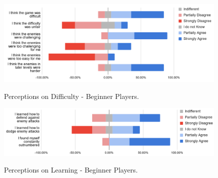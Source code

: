 

\begin{figure}[!ht]
    \begin{center}
    \caption{Perceptions on Difficulty - Beginner Players.}
        \includegraphics[width=36em]{figures/fig-perception-difficulty-beginner-players.png}
        \label{fig:perception-difficulty-beginner-players}
    \end{center}
\end{figure}

\begin{figure}[!ht]
    \begin{center}
    \caption{Perceptions on Learning - Beginner Players.}
        \includegraphics[width=36em]{figures/fig-perception-learning-beginner-players.png}
        \label{fig:perception-learning-beginner-players}
    \end{center}
\end{figure}

